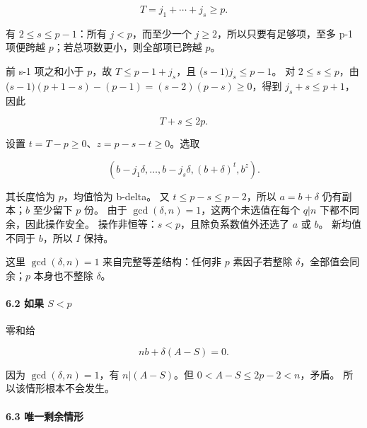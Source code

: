 \documentclass[11pt,a4paper]{article}
\theoremstyle{definition}
\numberwithin{equation}{section}
\begin{document}
\[
T=j_1+\cdots+j_s\ge p.
\]

{有} {\ensuremath{2\le s\le p-1}：所有} {\ensuremath{j<p}，而至少一个} {\ensuremath{j\ge 2}，所以只要有足够项，至多} {p-1} {项便跨越} {\ensuremath{p}；若总项数更小，则全部项已跨越} {\ensuremath{p}。}

{前} {s-1} {项之和小于} {\ensuremath{p}，故} {\ensuremath{T\le p-1+j_{s}}，且} {(\ensuremath{s-1)j_{s}\le p-1}。} {对} {\ensuremath{2\le s\le p}，由} {(\ensuremath{s-1)(p+1-s)-(p-1)=(s-2)(p-s)\ge 0}，得到} {\ensuremath{j_{s}+s\le p+1}，因此}

\[
T+s\le2p.
\]

{设置} {\ensuremath{t=T-p\ge 0}、\ensuremath{z=p-s-t\ge 0}。选取}

\[
\boxed{(b-j_1\delta,\ldots,b-j_s\delta,
(b+\delta)^t,b^z).}
\tag{C2.6}
\]

{其长度恰为} {\ensuremath{p}，均值恰为} {b-delta。} {又} {\ensuremath{t\le p-s\le p-2}，所以} {\ensuremath{a=b+\delta }} {仍有副本；\ensuremath{b}} {至少留下} {\ensuremath{p}} {份。} {由于} {\ensuremath{\operatorname{gcd}(\delta ,n)=1}，这两个未选值在每个} {\ensuremath{q|n}} {下都不同余，因此操作安全。} {操作非恒等：\ensuremath{s<p}，且除负系数值外还选了} {\ensuremath{a}} {或} {\ensuremath{b}。} {新均值不同于} {\ensuremath{b}，所以} {\ensuremath{I}} {保持。}

{这里} {\ensuremath{\operatorname{gcd}(\delta ,n)=1}} {来自完整等差结构：任何非} {\ensuremath{p}} {素因子若整除} {\ensuremath{\delta }，全部值会同余；\ensuremath{p}} {本身也不整除} {\ensuremath{\delta }。}

\paragraph*{\texorpdfstring{{6.2} {如果} {\ensuremath{S<p}}}{6.2 如果 }}\label{C2-h11}

{零和给}

\[
nb+\delta(A-S)=0.
\]

{因为} {\ensuremath{\operatorname{gcd}(\delta ,n)=1}，有} {\ensuremath{n|(A-S)}。但} {\ensuremath{0<A-S\le 2p-2<n}，矛盾。} {所以该情形根本不会发生。}

\paragraph*{\texorpdfstring{{6.3} {唯一剩余情形}}{6.3 唯一剩余情形}}\label{C2-h12}
\end{document}
